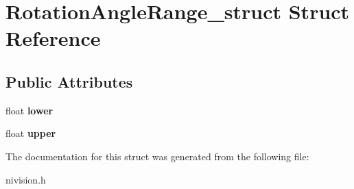 \hypertarget{structRotationAngleRange__struct}{\section{\-Rotation\-Angle\-Range\-\_\-struct \-Struct \-Reference}
\label{structRotationAngleRange__struct}
}
\subsection*{\-Public \-Attributes}
\begin{DoxyCompactItemize}
\item 
\hypertarget{structRotationAngleRange__struct_aca3043e5da20912d427b09cd2474275a}{float {\bfseries lower}}\label{structRotationAngleRange__struct_aca3043e5da20912d427b09cd2474275a}

\item 
\hypertarget{structRotationAngleRange__struct_ab773a7484f202f521c507128f207e2a3}{float {\bfseries upper}}\label{structRotationAngleRange__struct_ab773a7484f202f521c507128f207e2a3}

\end{DoxyCompactItemize}


\-The documentation for this struct was generated from the following file\-:\begin{DoxyCompactItemize}
\item 
nivision.\-h\end{DoxyCompactItemize}
